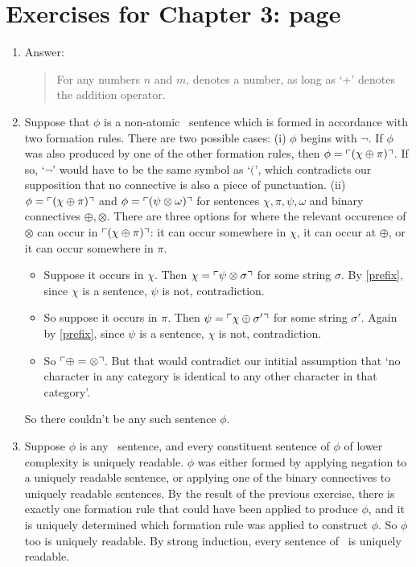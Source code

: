 {\section*{Exercises for Chapter 3: page \pageref{ex3}} \label{ans3}

\begin{enumerate}
	\item Answer: \begin{quote}
		For any numbers $n$ and $m$,  denotes a number, as long as `$+$' denotes the addition operator.
	\end{quote} \setcounter{enumi}{2}
	\item Suppose that $\phi$ is a non-atomic \lone\ sentence which is formed in accordance with two formation rules. There are two possible cases: (i) $\phi$ begins with $\neg$. If $\phi$ was also produced by one of the other formation rules, then $\phi = \ulcorner (\chi\oplus\pi) \urcorner$. If so, `$\neg$' would have to be the same symbol as `$($', which contradicts our supposition that no connective is also a piece of punctuation. (ii) $\phi = \ulcorner (\chi\oplus\pi) \urcorner$  and $\phi = \ulcorner (\psi\otimes\omega) \urcorner$ for sentences $\chi,\pi,\psi,\omega$ and binary connectives $\oplus,\otimes$. There are three options for where the relevant occurence of $\otimes$ can occur in $\ulcorner (\chi\oplus\pi) \urcorner$: it can occur somewhere in $\chi$, it can occur at $\oplus$, or it can occur somewhere in $\pi$. \begin{itemize}
		\item Suppose it occurs in $\chi$. Then $\chi = \ulcorner \psi\otimes\sigma \urcorner$ for some string $\sigma$. By \autoref{prefix}, since $\chi$ is a sentence, $\psi$ is not, contradiction. 

\item So suppose it occurs in $\pi$. Then $\psi = \ulcorner \chi\oplus\sigma' \urcorner$ for some string $\sigma'$. Again by \autoref{prefix}, since $\psi$ is a sentence, $\chi$ is not, contradiction.
\item So $\ulcorner \oplus=\otimes \urcorner$. But that would contradict our intitial assumption that `no character in any category is identical to any other character in that category'. 
	\end{itemize}
So there couldn't be any such sentence $\phi$.
\item Suppose $\phi$ is any \lone\ sentence, and every constituent sentence of $\phi$ of lower complexity is uniquely readable. $\phi$ was either formed by applying negation to a uniquely readable sentence, or applying one of the binary connectives to uniquely readable sentences. By the result of the previous exercise, there is exactly one formation rule that could have been applied to produce $\phi$, and it is uniquely determined which formation rule was applied to construct $\phi$. So $\phi$ too is uniquely readable.  By strong induction, every sentence of \lone\ is uniquely readable.
		

\end{enumerate}}

